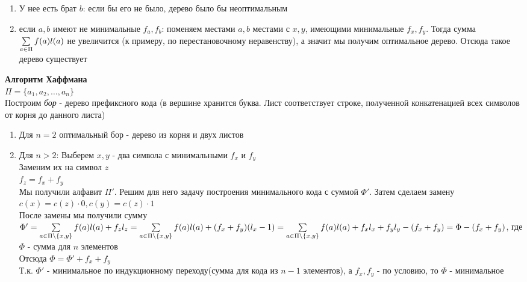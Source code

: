 \documentclass[12pt]{article}
\begin{document}
\begin{enumerate}
    \item У нее есть брат $b$: если бы его не было, дерево было бы неоптимальным
    \item если $a,b$ имеют не минимальные $f_a,f_b$: поменяем местами $a,b$ местами с $x,y$, имеющими минимальные $f_x,f_y$. Тогда сумма $\sum\limits_{a\in\Pi} f(a)l(a)$ не увеличится (к примеру, по перестановочному неравенству), а значит мы получим оптимальное дерево. Отсюда такое дерево существует
\end{enumerate}
\textbf{Алгоритм Хаффмана}\\
$\Pi = \{a_1,a_2,\ldots,a_n\}$\\
Построим \textit{бор} - дерево префиксного кода (в вершине хранится буква. Лист соответствует строке, полученной конкатенацией всех символов от корня до данного листа)\\
\begin{enumerate}
    \item Для $n = 2$ оптимальный бор - дерево из корня и двух листов
    \item Для $n > 2$:
    Выберем $x,y$ - два символа с минимальными $f_x$ и $f_y$\\
    Заменим их на символ $z$\\
    $f_z = f_x + f_y$\\
    Мы получили алфавит $\Pi'$. Решим для него задачу построения минимального кода с суммой $\Phi'$. Затем сделаем замену $c(x) = c(z)\cdot0, c(y) = c(z)\cdot1$\\
    После замены мы получили сумму\\
    $\Phi' = \sum\limits_{a\in\Pi\setminus \{x,y\}} f(a)l(a) + f_zl_z = \sum\limits_{a\in\Pi\setminus \{x,y\}} f(a)l(a) + (f_x+f_y)(l_x-1) = \sum\limits_{a\in\Pi\setminus \{x,y\}} f(a)l(a) + f_xl_x+f_yl_y - (f_x+f_y) = \Phi - (f_x+f_y)$, где $\Phi$ - сумма для $n$ элементов\\
    Отсюда $\Phi = \Phi'+f_x+f_y$\\
    Т.к. $\Phi'$ - минимальное по индукционному переходу(сумма для кода из $n-1$ элементов), а $f_x, f_y$ - по условию, то $\Phi$ -  минимальное
\end{enumerate}
\end{document}
